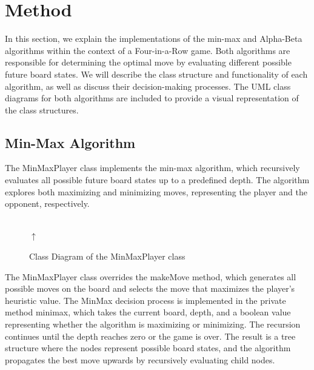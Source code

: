 \documentclass[11pt,a4paper]{article}
\begin{document}
\section{Method}
In this section, we explain the implementations of the min-max and Alpha-Beta algorithms within the context of a Four-in-a-Row game. Both algorithms are responsible for determining the optimal move by evaluating different possible future board states. We will describe the class structure and functionality of each algorithm, as well as discuss their decision-making processes. The UML class diagrams for both algorithms are included to provide a visual representation of the class structures.

\subsection{Min-Max Algorithm}
The MinMaxPlayer class implements the min-max algorithm, which recursively evaluates all possible future board states up to a predefined depth. The algorithm explores both maximizing and minimizing moves, representing the player and the opponent, respectively.

\begin{figure}[H]
\centering
{}
\\[-0.4em]
$\uparrow$\\[-0.4em]
\caption{Class Diagram of the MinMaxPlayer class}
\end{figure}

The MinMaxPlayer class overrides the makeMove method, which generates all possible moves on the board and selects the move that maximizes the player's heuristic value. The MinMax decision process is implemented in the private method minimax, which takes the current board, depth, and a boolean value representing whether the algorithm is maximizing or minimizing. The recursion continues until the depth reaches zero or the game is over. The result is a tree structure where the nodes represent possible board states, and the algorithm propagates the best move upwards by recursively evaluating child nodes.
\end{document}
